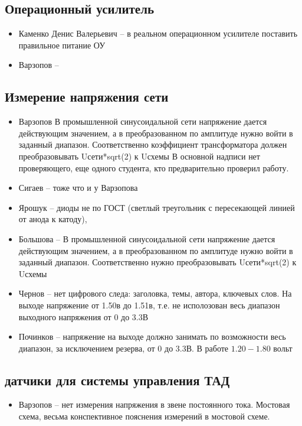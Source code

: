 \subsection*{Операционный усилитель}
\begin{itemize}
\item Каменко Денис Валерьевич -- в реальном операционном усилителе поставить правильное питание ОУ
\item Варзопов --
\end{itemize}

\subsection*{Измерение напряжения сети}
\begin{itemize}
\item Варзопов В промышленной синусоидальной сети напряжение дается действующим значением,
а в преобразованном по амплитуде нужно войти в заданный диапазон. Соответственно коэффициент трансформатора должен преобразовывать Uсети*sqrt(2) к Uсхемы 
В основной надписи нет проверяющего, еще одного студента, кто предварительно проверил работу. 
\item Сигаев -- тоже что и у Варзопова
\item Ярошук -- диоды не по ГОСТ (светлый треугольник с пересекающей линией от анода к катоду),
\item  Большова -- В промышленной синусоидальной сети напряжение дается действующим значением,
а в преобразованном по амплитуде нужно войти в заданный диапазон. Соответственно нужно преобразовывать Uсети*sqrt(2) к Uсхемы
\item Чернов -- нет цифрового следа: заголовка, темы, автора, ключевых слов. На выходе напряжение от 1.50в до 1.51в, т.е. не исполозован весь диапазон выходного напряжения от 0 до 3.3В
\item Починков -- напряжение на выходе должно занимать по возможности весь диапазон, за исключением резерва, от 0 до 3.3В. В работе $1.20-1.80$ вольт
\end{itemize}

\subsection*{датчики для системы управления ТАД}
\begin{itemize}
\item Варзопов -- нет измерения напряжения в звене постоянного тока. Мостовая схема, весьма конспективное пояснения измерений в мостовой схеме.
\end{itemize}


